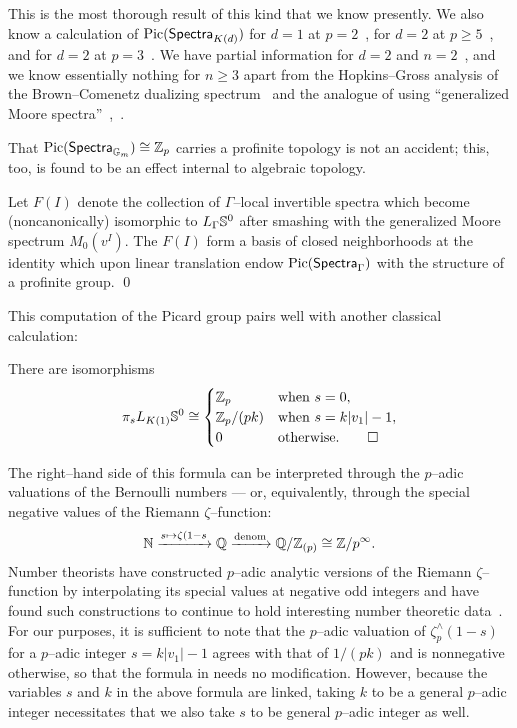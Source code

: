 \begin{remark}\label{PicardGroupsWeKnow}
This is the most thorough result of this kind that we know presently.  We also know a calculation of $\Pic(\CatOf{Spectra}_{K(d)})$ for $d = 1$ at $p = 2$~\cite[Theorem 3.3]{HMS}, for $d = 2$ at $p \ge 5$~\cite[Theorem 8.1]{BehrensRevisited}, and for $d = 2$ at $p = 3$~\cite[Theorem 1.2]{GHMR}.  We have partial information for $d = 2$ and $n = 2$~\cite[pg.\ 50]{StricklandInterpolate}, and we know essentially nothing for $n \ge 3$ apart from the Hopkins--Gross analysis of the Brown--Comenetz dualizing spectrum~\cite[Theorem 6]{HopkinsGrossAnnouncement} and the analogue of  using ``generalized Moore spectra''~\cite[Proposition 5.14]{HopkinsSmith},~\cite[Proposition 9.2-3]{HMS}.
\end{remark}

That $\Pic(\CatOf{Spectra}_{\G_m}) \cong \Z_p$ carries a profinite topology is not an accident; this, too, is found to be an effect internal to algebraic topology.
\begin{lemma}
Let $F(I)$ denote the collection of $\Gamma$--local invertible spectra which become (noncanonically) isomorphic to $L_\Gamma \S^0$ after smashing with the generalized Moore spectrum $M_0(v^I)$.  The $F(I)$ form a basis of closed neighborhoods at the identity which upon linear translation endow $\Pic(\CatOf{Spectra}_\Gamma)$ with the structure of a profinite group. \qed
\end{lemma}

This computation of the Picard group pairs well with another classical calculation:
\begin{theorem}\label{UnpretentiousCalculation}
There are isomorphisms \[\pi_s L_{K(1)} \S^0 \cong \begin{cases} \Z_p & \text{when $s = 0$}, \\ \Z_p / (pk) & \text{when $s = k|v_1| - 1$}, \\ 0 & \text{otherwise}. \qed \end{cases}\]
\end{theorem}

\noindent The right--hand side of this formula can be interpreted through the $p$--adic valuations of the Bernoulli numbers --- or, equivalently, through the special negative values of the Riemann $\zeta$--function: \[\mathbb N \xrightarrow{s \mapsto \zeta(1 - s} \Q \xrightarrow{\text{denom}} \Q / \Z_{(p)} \cong \Z / p^\infty.\]  Number theorists have constructed $p$--adic analytic versions of the Riemann $\zeta$--function by interpolating its special values at negative odd integers and have found such constructions to continue to hold interesting number theoretic data~\cite{Iwasawa}.  For our purposes, it is sufficient to note that the $p$--adic valuation of $\zeta^\wedge_p(1-s)$ for a $p$--adic integer $s = k|v_1| - 1$ agrees with that of $1/(pk)$ and is nonnegative otherwise, so that the formula in  needs no modification.  However, because the variables $s$ and $k$ in the above formula are linked, taking $k$ to be a general $p$--adic integer necessitates that we also take $s$ to be general $p$--adic integer as well.

